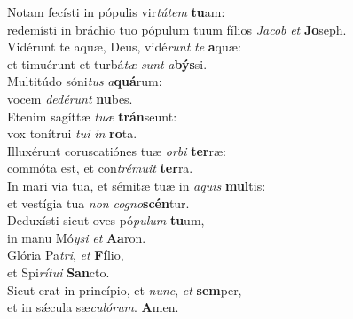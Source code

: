 \evenverse Notam fecísti in pópulis vir\textit{tú}\textit{tem} \textbf{tu}am:~\*\\
\evenverse redemísti in bráchio tuo pópulum tuum fílios \textit{Ja}\textit{cob} \textit{et} \textbf{Jo}seph.\\
\oddverse Vidérunt te aquæ, Deus, vidé\textit{runt} \textit{te} \textbf{a}quæ:~\*\\
\oddverse et timuérunt et turbá\textit{tæ} \textit{sunt} \textit{a}\textbf{býs}si.\\
\evenverse Multitúdo sóni\textit{tus} \textit{a}\textbf{quá}rum:~\*\\
\evenverse vocem \textit{de}\textit{dé}\textit{runt} \textbf{nu}bes.\\
\oddverse Etenim sagíttæ \textit{tu}\textit{æ} \textbf{trán}seunt:~\*\\
\oddverse vox tonítrui \textit{tu}\textit{i} \textit{in} \textbf{ro}ta.\\
\evenverse Illuxérunt coruscatiónes tuæ \textit{or}\textit{bi} \textbf{ter}ræ:~\*\\
\evenverse commóta est, et con\textit{tré}\textit{mu}\textit{it} \textbf{ter}ra.\\
\oddverse In mari via tua, et sémitæ tuæ in \textit{a}\textit{quis} \textbf{mul}tis:~\*\\
\oddverse et vestígia tua \textit{non} \textit{co}\textit{gno}\textbf{scén}tur.\\
\evenverse Deduxísti sicut oves pó\textit{pu}\textit{lum} \textbf{tu}um,~\*\\
\evenverse in manu Mó\textit{y}\textit{si} \textit{et} \textbf{A}\textbf{a}ron.\\
\oddverse Glória Pa\textit{tri}, \textit{et} \textbf{Fí}lio,~\*\\
\oddverse et Spi\textit{rí}\textit{tu}\textit{i} \textbf{San}cto.\\
\evenverse Sicut erat in princípio, et \textit{nunc}, \textit{et} \textbf{sem}per,~\*\\
\evenverse et in sǽcula sæ\textit{cu}\textit{ló}\textit{rum}. \textbf{A}men.\\
